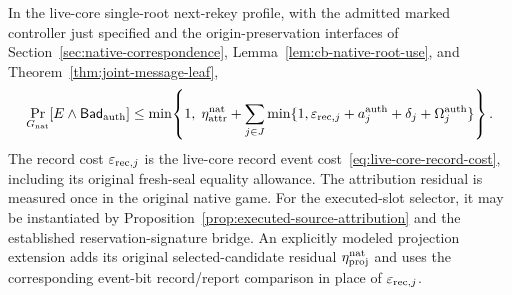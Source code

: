 \begin{theorem}
\label{thm:native-selected-authentication}
In the live-core single-root next-rekey profile, with the admitted marked
controller just specified and the origin-preservation interfaces of
Section~\ref{sec:native-correspondence}, Lemma~\ref{lem:cb-native-root-use},
and Theorem~\ref{thm:joint-message-leaf},
\begin{equation}
 \Pr_{G_{\rm nat}}[E\wedge\mathsf{Bad}_{\rm auth}]
 \le
 \min\!\left\{1,\;
 \eta_{\rm attr}^{\rm nat}
 +\sum_{j\in J}
  \min\{1,\varepsilon_{{\rm rec},j}
           +a_j^{\rm auth}+\delta_j+\Omega_j^{\rm auth}\}
 \right\}.
 \label{eq:native-selected-authentication}
\end{equation}
The record cost $\varepsilon_{{\rm rec},j}$ is the live-core record event
cost~\eqref{eq:live-core-record-cost}, including its original fresh-seal
equality allowance.  The attribution
residual is measured once in the original native game.  For the executed-slot
selector, it may be instantiated by
Proposition~\ref{prop:executed-source-attribution} and the established
reservation-signature bridge.  An explicitly modeled projection extension adds
its original selected-candidate residual $\eta_{\rm proj}^{\rm nat}$ and uses
the corresponding event-bit record/report comparison in place of
$\varepsilon_{{\rm rec},j}$.
\end{theorem}

